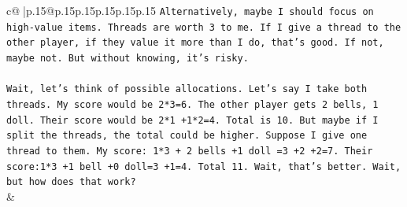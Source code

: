 \documentclass{article}
\begin{document}
{\begin{supertabular}{c@{$\;$}|p{.15\linewidth}@{}p{.15\linewidth}p{.15\linewidth}p{.15\linewidth}p{.15\linewidth}p{.15\linewidth}}
{{{\texttt{Alternatively, maybe I should focus on high{-}value items. Threads are worth 3 to me. If I give a thread to the other player, if they value it more than I do, that's good. If not, maybe not. But without knowing, it's risky.} \\
\\ 
\texttt{Wait, let's think of possible allocations. Let's say I take both threads. My score would be 2*3=6. The other player gets 2 bells, 1 doll. Their score would be 2*1 +1*2=4. Total is 10. But maybe if I split the threads, the total could be higher. Suppose I give one thread to them. My score: 1*3 + 2 bells +1 doll =3 +2 +2=7. Their score:1*3 +1 bell +0 doll=3 +1=4. Total 11. Wait, that's better. Wait, but how does that work?} \\
            }
        }
    }
    & \\ \\


\end{supertabular}}
\end{document}
